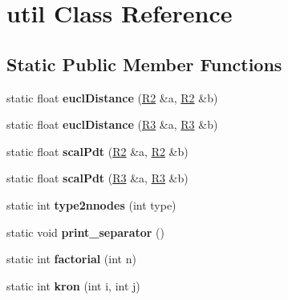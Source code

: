 \hypertarget{classutil}{}\section{util Class Reference}
\label{classutil}
\subsection*{Static Public Member Functions}
\begin{DoxyCompactItemize}
\item 
static float {\bfseries eucl\+Distance} (\hyperlink{class_r2}{R2} \&a, \hyperlink{class_r2}{R2} \&b)\hypertarget{classutil_a3bc4c5cef5a34fa434f56f39d7e9c570}{}\label{classutil_a3bc4c5cef5a34fa434f56f39d7e9c570}

\item 
static float {\bfseries eucl\+Distance} (\hyperlink{class_r3}{R3} \&a, \hyperlink{class_r3}{R3} \&b)\hypertarget{classutil_a1a0dae5f5220e28dbfd2cd5cd18d067c}{}\label{classutil_a1a0dae5f5220e28dbfd2cd5cd18d067c}

\item 
static float {\bfseries scal\+Pdt} (\hyperlink{class_r2}{R2} \&a, \hyperlink{class_r2}{R2} \&b)\hypertarget{classutil_a3d34105fe5d136a536fcf17451544833}{}\label{classutil_a3d34105fe5d136a536fcf17451544833}

\item 
static float {\bfseries scal\+Pdt} (\hyperlink{class_r3}{R3} \&a, \hyperlink{class_r3}{R3} \&b)\hypertarget{classutil_a367fe70ffd37d85bde88eab2b8034c62}{}\label{classutil_a367fe70ffd37d85bde88eab2b8034c62}

\item 
static int {\bfseries type2nnodes} (int type)\hypertarget{classutil_a19c3bd928272e5450adeb2e33712b026}{}\label{classutil_a19c3bd928272e5450adeb2e33712b026}

\item 
static void {\bfseries print\+\_\+separator} ()\hypertarget{classutil_a12f34bfee4596aa886fbd8e32baad2c9}{}\label{classutil_a12f34bfee4596aa886fbd8e32baad2c9}

\item 
static int {\bfseries factorial} (int n)\hypertarget{classutil_a987089633ed64d5eb0c0a81e285a224f}{}\label{classutil_a987089633ed64d5eb0c0a81e285a224f}

\item 
static int {\bfseries kron} (int i, int j)\hypertarget{classutil_a69b0c210adb1707905053bd0e7155f87}{}\label{classutil_a69b0c210adb1707905053bd0e7155f87}


\end{DoxyCompactItemize}

